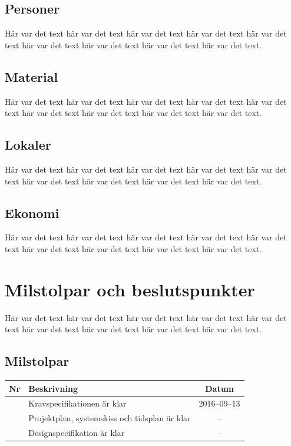\documentclass[a4paper,titlepage,12pt]{article}
\newcounter{milNr}
\newcommand{\nextMilNr}{\stepcounter{milNr}\arabic{milNr}}
\begin{document}
	
	\subsection{Personer}
	Här var det text här var det text här var det text
	här var det text här var det text här var det text
	här var det text här var det text här var det text.
	
	
	\subsection{Material}
	Här var det text här var det text här var det text
	här var det text här var det text här var det text
	här var det text här var det text här var det text.
	
	
	\subsection{Lokaler}
	Här var det text här var det text här var det text
	här var det text här var det text här var det text
	här var det text här var det text här var det text.
	
	
	\subsection{Ekonomi}
	Här var det text här var det text här var det text
	här var det text här var det text här var det text
	här var det text här var det text här var det text.
	
	
	\section{Milstolpar och beslutspunkter}
	Här var det text här var det text här var det text
	här var det text här var det text här var det text
	här var det text här var det text här var det text.
	
	
	\subsection{Milstolpar}
	\begin{longtable}[c]{ c l c}
		\textbf{Nr} & \textbf{Beskrivning} & \textbf{Datum} \\ \midrule
		\nextMilNr{} & Kravspecifikationen är klar & 2016--09--13 \\ \midrule
		\nextMilNr{} & Projektplan, systemskiss och tidsplan är klar & -- \\ \midrule
		\nextMilNr{} & Designspecifikation är klar & -- \\ \midrule
	\end{longtable}
	
\end{document}
